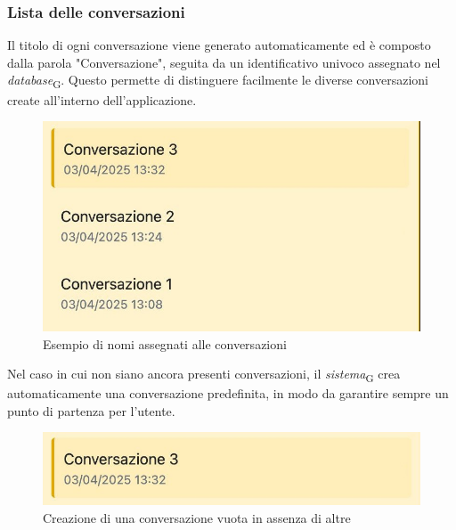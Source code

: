 \subsubsection{Lista delle conversazioni}
Il titolo di ogni conversazione viene generato automaticamente ed è composto dalla parola "Conversazione", seguita da un identificativo univoco assegnato nel \textit{database}\textsubscript{G}. Questo permette di distinguere facilmente le diverse conversazioni create all'interno dell'applicazione.
\begin{figure}[H]
\centering
\includegraphics[width=1\textwidth]{contents/img/nome_conv.jpg}
\caption{Esempio di nomi assegnati alle conversazioni}
\end{figure}

Nel caso in cui non siano ancora presenti conversazioni, il \textit{sistema}\textsubscript{G} crea automaticamente una conversazione predefinita, in modo da garantire sempre un punto di partenza per l’utente.
\begin{figure}[H]
\centering
\includegraphics[width=1\textwidth]{contents/img/default_conv.jpg}
\caption{Creazione di una conversazione vuota in assenza di altre}
\end{figure}

